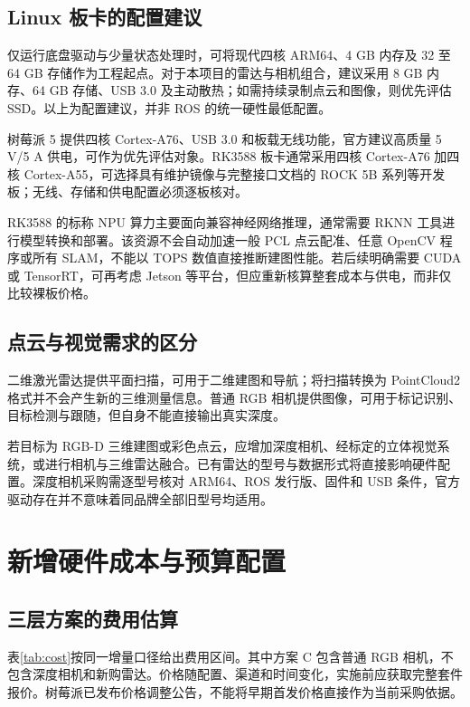 \documentclass[UTF8,fontset=none,a4paper,11pt]{ctexart}
\begin{document}
\subsection{Linux 板卡的配置建议}
仅运行底盘驱动与少量状态处理时，可将现代四核 ARM64、4 GB 内存及 32 至 64 GB 存储作为工程起点。对于本项目的雷达与相机组合，建议采用 8 GB 内存、64 GB 存储、USB 3.0 及主动散热；如需持续录制点云和图像，则优先评估 SSD。以上为配置建议，并非 ROS 的统一硬性最低配置。

树莓派 5 提供四核 Cortex-A76、USB 3.0 和板载无线功能，官方建议高质量 5 V/5 A 供电，可作为优先评估对象\cite{pi5}。RK3588 板卡通常采用四核 Cortex-A76 加四核 Cortex-A55，可选择具有维护镜像与完整接口文档的 ROCK 5B 系列等开发板；无线、存储和供电配置必须逐板核对\cite{rock5}。

RK3588 的标称 NPU 算力主要面向兼容神经网络推理，通常需要 RKNN 工具进行模型转换和部署。该资源不会自动加速一般 PCL 点云配准、任意 OpenCV 程序或所有 SLAM，不能以 TOPS 数值直接推断建图性能\cite{rknn}。若后续明确需要 CUDA 或 TensorRT，可再考虑 Jetson 等平台，但应重新核算整套成本与供电，而非仅比较裸板价格。

\subsection{点云与视觉需求的区分}
二维激光雷达提供平面扫描，可用于二维建图和导航；将扫描转换为 PointCloud2 格式并不会产生新的三维测量信息。普通 RGB 相机提供图像，可用于标记识别、目标检测与跟随，但自身不能直接输出真实深度。

若目标为 RGB-D 三维建图或彩色点云，应增加深度相机、经标定的立体视觉系统，或进行相机与三维雷达融合。已有雷达的型号与数据形式将直接影响硬件配置。深度相机采购需逐型号核对 ARM64、ROS 发行版、固件和 USB 条件，官方驱动存在并不意味着同品牌全部旧型号均适用\cite{orbbec}。

\section{新增硬件成本与预算配置}
\subsection{三层方案的费用估算}
表\ref{tab:cost}按同一增量口径给出费用区间。其中方案 C 包含普通 RGB 相机，不包含深度相机和新购雷达。价格随配置、渠道和时间变化，实施前应获取完整套件报价。树莓派已发布价格调整公告，不能将早期首发价格直接作为当前采购依据\cite{pi_price}。
\end{document}
